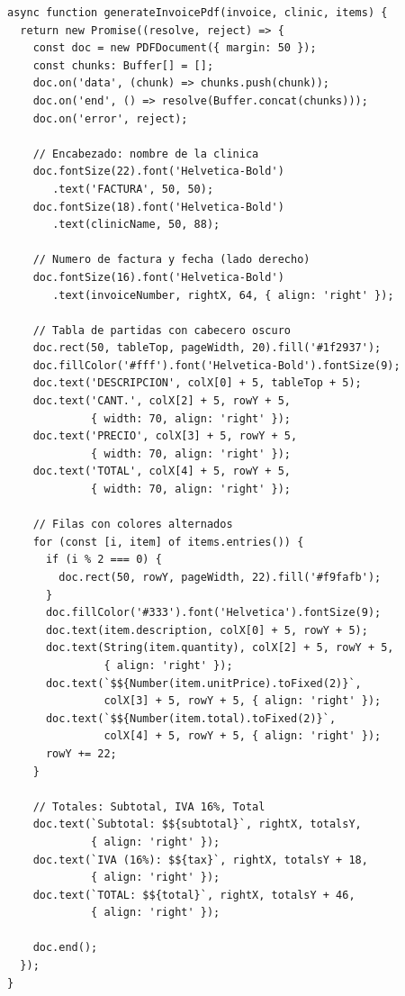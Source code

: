\begin{lstlisting}[style=typescript, caption=Funcion generateInvoicePdf con pdfkit]
async function generateInvoicePdf(invoice, clinic, items) {
  return new Promise((resolve, reject) => {
    const doc = new PDFDocument({ margin: 50 });
    const chunks: Buffer[] = [];
    doc.on('data', (chunk) => chunks.push(chunk));
    doc.on('end', () => resolve(Buffer.concat(chunks)));
    doc.on('error', reject);

    // Encabezado: nombre de la clinica
    doc.fontSize(22).font('Helvetica-Bold')
       .text('FACTURA', 50, 50);
    doc.fontSize(18).font('Helvetica-Bold')
       .text(clinicName, 50, 88);

    // Numero de factura y fecha (lado derecho)
    doc.fontSize(16).font('Helvetica-Bold')
       .text(invoiceNumber, rightX, 64, { align: 'right' });

    // Tabla de partidas con cabecero oscuro
    doc.rect(50, tableTop, pageWidth, 20).fill('#1f2937');
    doc.fillColor('#fff').font('Helvetica-Bold').fontSize(9);
    doc.text('DESCRIPCION', colX[0] + 5, tableTop + 5);
    doc.text('CANT.', colX[2] + 5, rowY + 5,
             { width: 70, align: 'right' });
    doc.text('PRECIO', colX[3] + 5, rowY + 5,
             { width: 70, align: 'right' });
    doc.text('TOTAL', colX[4] + 5, rowY + 5,
             { width: 70, align: 'right' });

    // Filas con colores alternados
    for (const [i, item] of items.entries()) {
      if (i % 2 === 0) {
        doc.rect(50, rowY, pageWidth, 22).fill('#f9fafb');
      }
      doc.fillColor('#333').font('Helvetica').fontSize(9);
      doc.text(item.description, colX[0] + 5, rowY + 5);
      doc.text(String(item.quantity), colX[2] + 5, rowY + 5,
               { align: 'right' });
      doc.text(`$${Number(item.unitPrice).toFixed(2)}`,
               colX[3] + 5, rowY + 5, { align: 'right' });
      doc.text(`$${Number(item.total).toFixed(2)}`,
               colX[4] + 5, rowY + 5, { align: 'right' });
      rowY += 22;
    }

    // Totales: Subtotal, IVA 16%, Total
    doc.text(`Subtotal: $${subtotal}`, rightX, totalsY,
             { align: 'right' });
    doc.text(`IVA (16%): $${tax}`, rightX, totalsY + 18,
             { align: 'right' });
    doc.text(`TOTAL: $${total}`, rightX, totalsY + 46,
             { align: 'right' });

    doc.end();
  });
}
\end{lstlisting}

